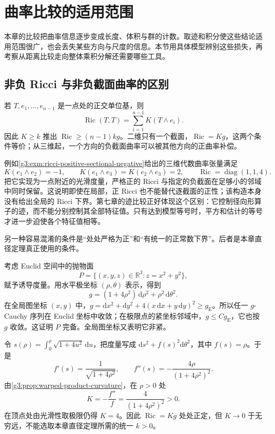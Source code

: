 
% 
% 
% 

\section{曲率比较的适用范围}
\label{g3:sec:0804}

本章的比较把曲率信息逐步变成长度、体积与群的计数。取迹和积分使这些结论适用范围很广，也会丢失某些方向与尺度的信息。本节用具体模型辨别这些损失，再考察从距离比较走向整体乘积分解还需要哪些工具。

\subsection{非负 Ricci 与非负截面曲率的区别}
\label{g3:subsec:0804:01}

若 \(T,e_1,\ldots,e_{n-1}\) 是一点处的正交单位基，则
\[
	\operatorname{Ric}(T,T)=\sum_{i=1}^{n-1}K(T\wedge e_i).
\]
因此 \(K\ge k\) 推出 \(\operatorname{Ric}\ge(n-1)kg\)。二维只有一个截面，\(\operatorname{Ric}=Kg\)，这两个条件等价；从三维起，一个方向的负截面曲率可以被其他方向的正曲率补偿。

例如\cref{g3:exm:ricci-positive-sectional-negative}给出的三维代数曲率张量满足
\[
	K(e_1\wedge e_2)=-1,\qquad
	K(e_1\wedge e_3)=K(e_2\wedge e_3)=2,
	\qquad \operatorname{Ric}=\operatorname{diag}(1,1,4).
\]
把它实现为一点附近的光滑度量，严格正的 Ricci 与指定的负截面在足够小的邻域中同时保留。这说明即使在局部，正 Ricci 也不能替代逐截面的正性；该构造本身没有给出全局的 Ricci 下界。第七章的迹比较正好体现这个区别：它控制径向形算子的迹，而不能分别控制其全部特征值。只有达到模型等号时，平方和估计的等号才进一步迫使各个特征值相等。

另一种容易混淆的条件是“处处严格为正”和“有统一的正常数下界”。后者是本章直径定理真正使用的条件。

\begin{example}\label{g3:exm:positive-paraboloid}
	考虑 Euclid 空间中的抛物面
	\[
		P=\{(x,y,z)\in\mathbb R^3:z=x^2+y^2\},
	\]
	赋予诱导度量。用水平极坐标 \((\rho,\theta)\) 表示，得到
	\[
		g=(1+4\rho^2)\,\mathrm d\rho^2+\rho^2\,\mathrm d\theta^2.
	\]
	在全局图坐标 \((x,y)\) 中，\(g=\mathrm dx^2+\mathrm dy^2+4(x\,\mathrm dx+y\,\mathrm dy)^2\ge g_{\mathrm E}\)。所以任一 \(g\)-Cauchy 序列在 Euclid 坐标中收敛；在极限点的紧坐标邻域中，\(g\le Cg_{\mathrm E}\)，它也按 \(g\) 收敛。这证明 \(P\) 完备。全局图坐标又表明它非紧。

	令 \(s(\rho)=\int_0^\rho\sqrt{1+4u^2}\,\mathrm du\)，把度量写成 \(\mathrm ds^2+f(s)^2\mathrm d\theta^2\)，其中 \(f(s)=\rho\)。于是
	\[
		f'(s)=\frac1{\sqrt{1+4\rho^2}},\qquad
		f''(s)=-\frac{4\rho}{(1+4\rho^2)^2}.
	\]
	由\cref{g3:prop:warped-product-curvature}，在 \(\rho>0\) 处
	\[
		K=-\frac{f''}{f}=\frac4{(1+4\rho^2)^2}>0.
	\]
	在顶点处由光滑性取极限仍得 \(K=4\)。因此 \(\operatorname{Ric}=Kg\) 处处正定，但 \(K\to0\) 于无穷远，不能选取本章直径定理所需的统一 \(k>0\)。
\end{example}

